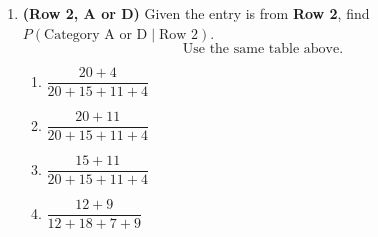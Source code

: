 \documentclass[12pt]{article}
\begin{document}
\begin{enumerate}[label=\textbf{S\arabic*.}]
\item \textbf{(Row 2, A or D)} Given the entry is from \textbf{Row 2}, find $P(\text{Category A or D}\mid \text{Row 2})$.
\[
\text{Use the same table above.}
\]
\begin{enumerate}[label=(\Alph*)]
\item $\dfrac{20+4}{20+15+11+4}$
\item $\dfrac{20+11}{20+15+11+4}$
\item $\dfrac{15+11}{20+15+11+4}$
\item $\dfrac{12+9}{12+18+7+9}$
\end{enumerate}

\end{enumerate}
\end{document}

